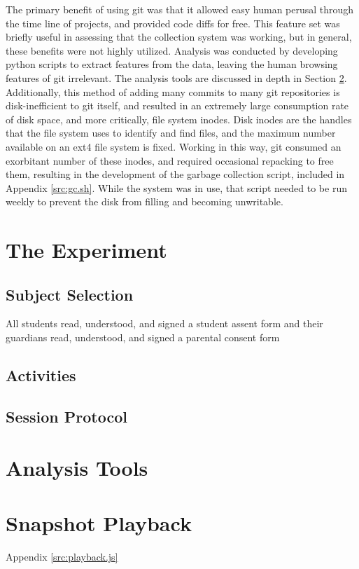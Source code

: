 The primary benefit of using git was that it allowed easy human perusal through the time line of projects, and provided code diffs for free. This feature set was briefly useful in assessing that the collection system was working, but in general, these benefits were not highly utilized. Analysis was conducted by developing python scripts to extract features from the data, leaving the human browsing features of git irrelevant. The analysis tools are discussed in depth in Section \ref{sec:analysis-plan}. Additionally, this method of adding many commits to many git repositories is disk-inefficient to git itself, and resulted in an extremely large consumption rate of disk space, and more critically, file system inodes. Disk inodes are the handles that the file system uses to identify and find files, and the maximum number available on an ext4 file system is fixed. Working in this way, git consumed an exorbitant number of these inodes, and required occasional repacking to free them, resulting in the development of the garbage collection script, included in Appendix \ref{src:gc.sh}. While the system was in use, that script needed to be run weekly to prevent the disk from filling and becoming unwritable. 


\section{The Experiment}

\subsection{Subject Selection} 

All students read, understood, and signed a student assent form and their guardians read, understood, and signed a parental consent form 

\subsection{Activities}

\subsection{Session Protocol}


\section{Analysis Tools} \label{sec:analysis-plan}


\section{Snapshot Playback}
Appendix \ref{src:playback.js}




